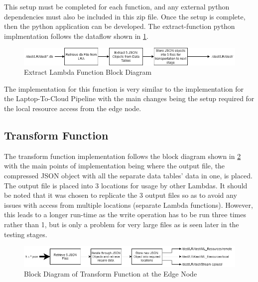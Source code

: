 This setup must be completed for each function, and any external python dependencies must also be included in this zip file. Once the setup is complete, then the python application can be developed. The extract-function python implmentation follows the dataflow shown in \ref{fig:lambda_extract_fn}.

\begin{figure}[ht]
    \centering
    \includegraphics[width=1\linewidth]{pages/Chapter4/Chapter 4 Images/LambdaFns/extract-fn.png}
    \caption{Extract Lambda Function Block Diagram}
    \label{fig:lambda_extract_fn}
\end{figure}

The implementation for this function is very similar to the implementation for the Laptop-To-Cloud Pipeline with the main changes being the setup required for the local resource access from the edge node.

\subsection{Transform Function}
\label{transform_fn_impl}
The transform function implementation follows the block diagram shown in \ref{fig:lambda_transform_fn} with the main points of implementation being where the output file, the compressed JSON object with all the separate data tables' data in one, is placed. The output file is placed into 3 locations for usage by other Lambdas. It should be noted that it was chosen to replicate the 3 output files so as to avoid any issues with access from multiple locations (separate Lambda functions). However, this leads to a longer run-time as the write operation has to be run three times rather than 1, but is only a problem for very large files as is seen later in the testing stages.

\begin{figure}[ht]
    \centering
    \includegraphics[width=1\linewidth]{pages/Chapter4/Chapter 4 Images/LambdaFns/transform-fn.png}
    \caption{Block Diagram of Transform Function at the Edge Node}
    \label{fig:lambda_transform_fn}
\end{figure}


